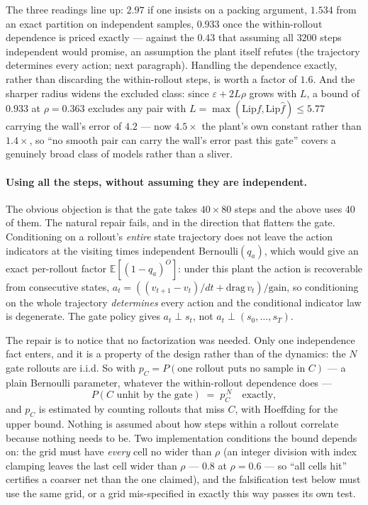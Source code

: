 \documentclass[11pt]{article}
\theoremstyle{definition}
\theoremstyle{remark}
\begin{document}
The three readings line up: $2.97$ if one insists on a packing argument, $1.534$ from an exact partition on independent samples, $0.933$ once the within-rollout dependence is priced exactly --- against the $0.43$ that assuming all $3200$ steps independent would promise, an assumption the plant itself refutes (the trajectory determines every action; next paragraph). Handling the dependence exactly, rather than discarding the within-rollout steps, is worth a factor of $1.6$. And the sharper radius widens the excluded class: since $\varepsilon + 2L\rho$ grows with $L$, a bound of $0.933$ at $\rho = 0.363$ excludes any pair with $L = \max(\mathrm{Lip} f, \mathrm{Lip}\hat f) \leq 5.77$ carrying the wall's error of $4.2$ --- now $4.5\times$ the plant's own constant rather than $1.4\times$, so ``no smooth pair can carry the wall's error past this gate'' covers a genuinely broad class of models rather than a sliver.

\paragraph{Using all the steps, without assuming they are independent.} The obvious objection is that the gate takes $40 \times 80$ steps and the above uses 40 of them. The natural repair fails, and in the direction that flatters the gate. Conditioning on a rollout's \emph{entire} state trajectory does not leave the action indicators at the visiting times independent Bernoulli$(q_a)$, which would give an exact per-rollout factor $\mathbb{E}[(1-q_a)^{O}]$: under this plant the action is recoverable from consecutive states, $a_t = ((v_{t+1}-v_t)/dt + \mathrm{drag}\,v_t)/\mathrm{gain}$, so conditioning on the whole trajectory \emph{determines} every action and the conditional indicator law is degenerate. The gate policy gives $a_t \perp s_t$, not $a_t \perp (s_0,\dots,s_T)$.

The repair is to notice that no factorization was needed. Only one independence fact enters, and it is a property of the design rather than of the dynamics: the $N$ gate rollouts are i.i.d. So with $p_C = P(\text{one rollout puts no sample in } C)$ --- a plain Bernoulli parameter, whatever the within-rollout dependence does ---
\[
  P(C \text{ unhit by the gate}) \;=\; p_C^{\,N} \quad \text{exactly},
\]
and $p_C$ is estimated by counting rollouts that miss $C$, with Hoeffding for the upper bound. Nothing is assumed about how steps within a rollout correlate because nothing needs to be. Two implementation conditions the bound depends on: the grid must have \emph{every} cell no wider than $\rho$ (an integer division with index clamping leaves the last cell wider than $\rho$ --- $0.8$ at $\rho = 0.6$ --- so ``all cells hit'' certifies a coarser net than the one claimed), and the falsification test below must use the same grid, or a grid mis-specified in exactly this way passes its own test.
\end{document}

